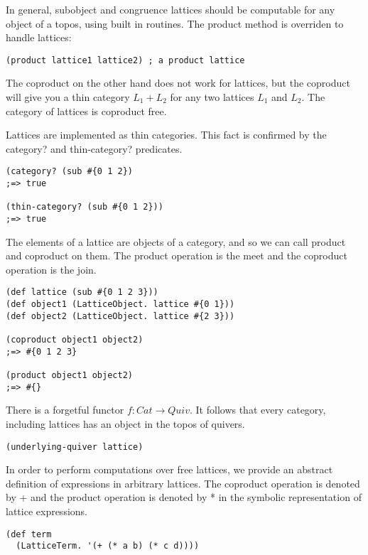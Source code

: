 \documentclass[a4paper,11pt]{report}
\begin{document}
In general, subobject and congruence lattices should be computable for any object of a topos, using built in routines. The product method is overriden to handle lattices:

\lstset {language=Lisp}
\begin{lstlisting}
(product lattice1 lattice2) ; a product lattice
\end{lstlisting}

The coproduct on the other hand does not work for lattices, but the coproduct will give you a thin category $L_1 + L_2$ for any two lattices $L_1$ and $L_2$. The category of lattices is coproduct free.

\newpage 

Lattices are implemented as thin categories. This fact is confirmed by the category? and thin-category? predicates.

\lstset {language=Lisp}
\begin{lstlisting}
(category? (sub #{0 1 2}) 
;=> true

(thin-category? (sub #{0 1 2}))
;=> true
\end{lstlisting}

The elements of a lattice are objects of a category, and so we can call product and coproduct on them. The product operation is the meet and the coproduct operation is the join.

\lstset {language=Lisp}
\begin{lstlisting}
(def lattice (sub #{0 1 2 3}))
(def object1 (LatticeObject. lattice #{0 1}))
(def object2 (LatticeObject. lattice #{2 3}))

(coproduct object1 object2)
;=> #{0 1 2 3}

(product object1 object2)
;=> #{}
\end{lstlisting}

There is a forgetful functor $f: Cat \to Quiv$. It follows that every category, including lattices has an object in the topos of quivers.

\lstset {language=Lisp}
\begin{lstlisting}
(underlying-quiver lattice)
\end{lstlisting}

In order to perform computations over free lattices, we provide an abstract definition of expressions in arbitrary lattices. The coproduct operation is denoted by + and the product operation is denoted by * in the symbolic representation of lattice expressions.

\lstset {language=Lisp}
\begin{lstlisting}
(def term 
  (LatticeTerm. '(+ (* a b) (* c d))))
\end{lstlisting}
\end{document}
